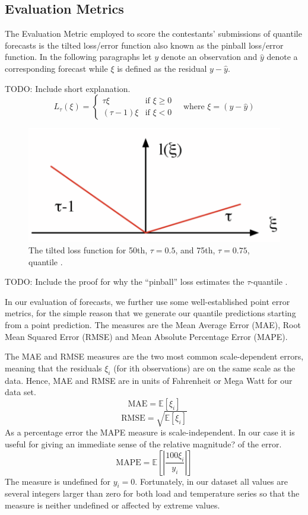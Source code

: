 \documentclass[conference]{IEEEtran}
\begin{document}
\subsection{Evaluation Metrics}
The Evaluation Metric employed to score the contestants' submissions of quantile forecasts is the tilted loss/error function also known as the pinball loss/error function. In the following paragraphs let $y$ denote an observation and $\hat{y}$ denote a corresponding forecast while $\xi$ is defined as the residual $y-\hat{y}$.\par
TODO: Include short explanation.
\[
  L_{\tau}(\xi)=\begin{cases} \tau \xi & \text{if } \xi \geq 0 \\
                                          (\tau-1)\xi & \text{if } \xi < 0 
                                  \end{cases} \quad\text{where } \xi=(y-\hat{y})
\]

\begin{figure}[ht!]
\centering
\includegraphics[width=\linewidth]{gfx/pinball.pdf}
\caption{The tilted loss function for 50th, $\tau=0.5$, and 75th, $\tau=0.75$, quantile \cite{Takeuchi2005}.}
\label{fig:pinball}
\end{figure}
TODO: Include the proof for why the ``pinball'' loss estimates the $\tau$-quantile \cite{Takeuchi2005}.\par
In our evaluation of forecasts, we further use some well-established point error metrics, for the simple reason that we generate our quantile predictions starting from a point prediction. The measures are the Mean Average Error (MAE), Root Mean Squared Error (RMSE) and Mean Absolute Percentage Error (MAPE).\par
The MAE and RMSE measures are the two most common scale-dependent errors, meaning that the residuals $\xi_i$ (for ith observations) are on the same scale as the data. Hence, MAE and RMSE are in units of Fahrenheit or Mega Watt for our data set. 
\[
  \text{MAE}=\mathbb{E}[\xi_i]
\]
\[
  \text{RMSE}=\sqrt{\mathbb{E}[\xi_i]}
\]
As a percentage error the MAPE measure is scale-independent. In our case it is useful for giving an immediate sense of the relative magnitude? of the error.
\[
  \text{MAPE}=\mathbb{E}\left[\left| \frac{100\xi_i}{y_i} \right|\right]
\]
The measure is undefined for $y_i=0$. Fortunately, in our dataset all values are several integers larger than zero for both load and temperature series so that the measure is neither undefined or affected by extreme values.
\end{document}
